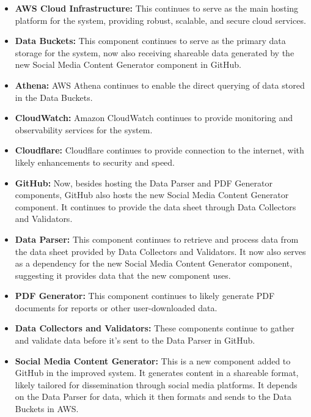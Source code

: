 \documentclass[12pt, letterpaper]{article}
\begin{document}
\begin{itemize}
    \item \textbf{AWS Cloud Infrastructure:} This continues to serve as the main hosting platform for the system, providing robust, scalable, and secure cloud services.
    
    \item \textbf{Data Buckets:} This component continues to serve as the primary data storage for the system, now also receiving shareable data generated by the new Social Media Content Generator component in GitHub.
    
    \item \textbf{Athena:} AWS Athena continues to enable the direct querying of data stored in the Data Buckets.
    
    \item \textbf{CloudWatch:} Amazon CloudWatch continues to provide monitoring and observability services for the system.
    
    \item \textbf{Cloudflare:} Cloudflare continues to provide connection to the internet, with likely enhancements to security and speed.
    
    \item \textbf{GitHub:} Now, besides hosting the Data Parser and PDF Generator components, GitHub also hosts the new Social Media Content Generator component. It continues to provide the data sheet through Data Collectors and Validators.
    
    \item \textbf{Data Parser:} This component continues to retrieve and process data from the data sheet provided by Data Collectors and Validators. It now also serves as a dependency for the new Social Media Content Generator component, suggesting it provides data that the new component uses.
    
    \item \textbf{PDF Generator:} This component continues to likely generate PDF documents for reports or other user-downloaded data.
    
    \item \textbf{Data Collectors and Validators:} These components continue to gather and validate data before it's sent to the Data Parser in GitHub.
    
    \item \textbf{Social Media Content Generator:} This is a new component added to GitHub in the improved system. It generates content in a shareable format, likely tailored for dissemination through social media platforms. It depends on the Data Parser for data, which it then formats and sends to the Data Buckets in AWS.
\end{itemize}
\end{document}

